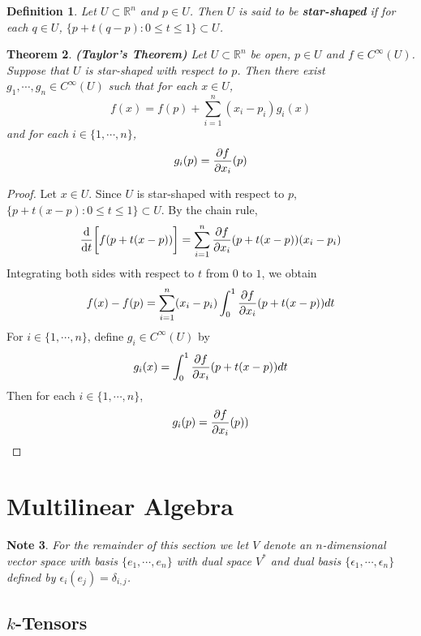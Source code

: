 \documentclass[12pt]{amsart}
\newtheorem{thm}{Theorem}[subsection]
\newtheorem{defn}[thm]{Definition}
\newtheorem{note}[thm]{Note}
\newcommand{\del}{\delta}
\newcommand{\ep}{\epsilon}
\newcommand{\R}{\mathbb{R}}
\begin{document}
	\begin{defn} 
		Let $U \subset \R^n$ and $p \in U$. Then $U$ is said to be \textbf{star-shaped} if for each $q \in U$, $\{p + t(q-p): 0 \leq t \leq 1\} \subset U$.
	\end{defn}

	\begin{thm} \textbf{(Taylor's Theorem)}
		Let $U \subset \R^n$ be open, $p \in U$ and $f \in C^{\infty}(U)$. Suppose that $U$ is star-shaped with respect to $p$. Then there exist $g_1, \cdots, g_n \in C^{\infty}(U)$ such that for each $x \in U$, $$f(x) = f(p) + \sum_{i=1}^n (x_i - p_i) g_i(x)$$ and for each $i \in \{1, \cdots, n\}$, $$g_i(p) = {\pdv{f}{x_i}}(p)$$
	\end{thm}

	\begin{proof}
		Let $x \in U$. Since $U$ is star-shaped with respect to $p$, $\{p + t(x-p): 0 \leq t \leq 1\} \subset U$. By the chain rule, 
		$${\dv{t}} \bigg[ f(p+t(x-p)) \bigg] = \sum_{i=1}^n {\pdv{f}{x_i}}(p+t(x-p)) (x_i - p_i)$$
		Integrating both sides with respect to $t$ from $0$ to $1$, we obtain
		$$f(x) - f(p) = \sum_{i=1}^n (x_i - p_i) \int_{0}^{1}  {\pdv{f}{x_i}}(p+t(x-p)) dt $$
		For $i \in \{1, \cdots, n\}$, define $g_i \in C^{\infty}(U)$ by $$g_i(x) = \int_{0}^{1}  {\pdv{f}{x_i}}(p+t(x-p)) dt$$
		Then for each $i \in \{1, \cdots, n\}$, $$g_i(p) = {\pdv{f}{x_i}}(p))$$
	\end{proof}
















\newpage
	\section{Multilinear Algebra}
	
	\begin{note}
		For the remainder of this section we let $V$ denote an $n$-dimensional vector space with basis $\{e_1, \cdots, e_n\}$ with dual space $V^*$ and dual basis $\{\ep_1, \cdots, \ep_n\}$ defined by $\ep_i(e_j) = \del_{i,j}$.
	\end{note}

	\subsection{$k$-Tensors}
	
\end{document}
